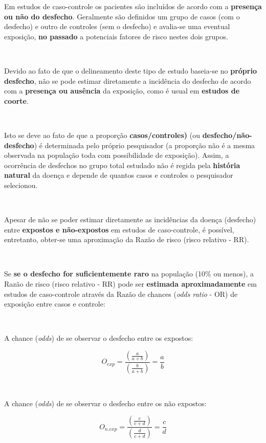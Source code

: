 \documentclass[
]{book}
\begin{document}
\hfill\break

Em estudos de caso-controle os pacientes são incluídos de acordo com a \textbf{presença ou não do desfecho}. Geralmente são definidos um grupo de casos (com o desfecho) e outro de controles (sem o desfecho) e avalia-se uma eventual exposição, \textbf{no passado} a potenciais fatores de risco nestes dois grupos.

~

Devido ao fato de que o delineamento deste tipo de estudo baseia-se no \textbf{próprio desfecho}, não se pode estimar diretamente a incidência do desfecho de acordo com a \textbf{presença ou ausência} da exposição, como é usual em \textbf{estudos de coorte}.

~

Isto se deve ao fato de que a proporção \textbf{casos/controles)} (ou \textbf{desfecho/não-desfecho}) é determinada pelo próprio pesquisador (a proporção não é a mesma observada na população toda com possibilidade de exposição). Assim, a ocorrência de desfechos no grupo total estudado não é regida pela \textbf{história natural} da doença e depende de quantos casos e controles o pesquisador selecionou.

~

Apesar de não se poder estimar diretamente as incidências da doença (desfecho) entre \textbf{expostos e não-expostos} em estudos de caso-controle, é possível, entretanto, obter-se uma aproximação da Razão de risco (risco relativo - RR).

~

Se \textbf{se o desfecho for suficientemente raro} na população (10\% ou menos), a Razão de risco (risco relativo - RR) pode ser \textbf{estimada aproximadamente} em estudos de caso-controle através da Razão de chances (\emph{odds ratio} - OR) de exposição entre casos e controle:

~

A chance (\emph{odds}) de se observar o desfecho entre os expostos:

\hfill\break

\[
O_{exp}=\frac{\left(\frac{a}{a+b}\right)}{\left(\frac{b}{a+b}\right)}= \frac{a}{b}
\]

~

A chance (\emph{odds}) de se observar o desfecho entre os não expostos:

\hfill\break

\[
O_{n.exp}=\frac{\left(\frac{c}{c+d}\right)}{\left(\frac{d}{c+d}\right)}= \frac{c}{d}
\]
\end{document}
